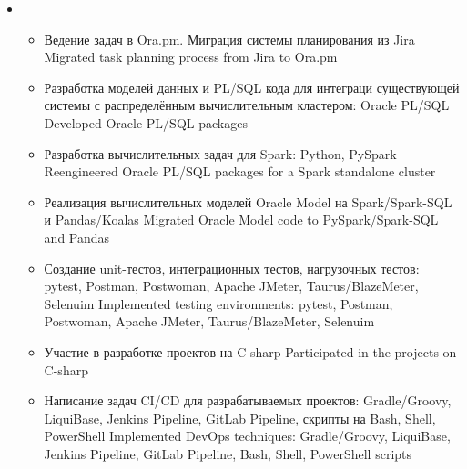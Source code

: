 \documentclass[11pt,a4paper,sans, russian]{moderncv}        %
\begin{document}
{\begin{itemize}
\begin{itemize}
				{Desinged and implemented Hadoop-based calculation clusters: Hadoop HDFS/YARN, ZooKeeper, Spark, Hive, Kyuubi Thrift JDBS/ODBC Server, Alluxio}
			\item {}
				{Проработка целевой архитектуры распределённой вычислительной системы с использованием различных стеков технологий}
				{Architecture desing for a distributed calculation subsystem to migrate from Oracle Model}
			\item {}
				{Проработка архитектуры прикладного программного обеспечения и взаимодействия компонент разрабатываемого решения}
				{System architecture desing for all software components of the projects}
			\item {}
				{Участие в технических совещаниях с заказчиком, участие в защите решения у заказчика, написание технической документации}
				{Participated in technical meetings with customers, written technical documentation}
		\end{itemize}
		\item {}
		\begin{itemize}
			\item {}
				{Ведение задач в Ora.pm. Миграция системы планирования из Jira}
				{Migrated task planning process from Jira to Ora.pm}
			\item {}
				{Разработка моделей данных и PL/SQL кода для интеграци существующей системы с распределённым вычислительным кластером: Oracle PL/SQL}
				{Developed Oracle PL/SQL packages}
			\item {}
				{Разработка вычислительных задач для Spark: Python, PySpark}
				{Reengineered Oracle PL/SQL packages for a Spark standalone cluster}
			\item {}
				{Реализация вычислительных моделей Oracle Model на Spark/Spark-SQL и Pandas/Koalas}
				{Migrated Oracle Model code to PySpark/Spark-SQL and Pandas}
			\item {}
				{Создание unit-тестов, интеграционных тестов, нагрузочных тестов: pytest, Postman, Postwoman, Apache JMeter, Taurus/BlazeMeter, Selenuim}
				{Implemented testing environments: pytest, Postman, Postwoman, Apache JMeter, Taurus/BlazeMeter, Selenuim}
			\item {}
				{Участие в разработке проектов на C-sharp}
				{Participated in the projects on C-sharp}
			\item {}
				{Написание задач CI/CD для разрабатываемых проектов: Gradle/Groovy, LiquiBase, Jenkins Pipeline, GitLab Pipeline, скрипты на Bash, Shell, PowerShell}
				{Implemented DevOps techniques: Gradle/Groovy, LiquiBase, Jenkins Pipeline, GitLab Pipeline, Bash, Shell, PowerShell scripts}	
		\end{itemize}
	\end{itemize}
}
\end{document}
